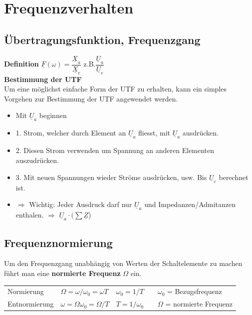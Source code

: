 \section{Frequenzverhalten}

	\subsection{Übertragungsfunktion, Frequenzgang}

		\textbf{Definition} 
		$\underline{F}(\omega) = \dfrac{\underline{X}_a}{\underline{X}_e}$ z.B.$\dfrac{\underline{U}_a}{\underline{U}_e}$\\
		
		\textbf{Bestimmung der UTF}\\
		Um eine möglichst einfache Form der UTF zu erhalten, kann ein simples Vorgehen zur Bestimmung der UTF angewendet werden.
		
		\begin{itemize}
			\item Mit $\underline{U}_a$ beginnen
			\item 1. Strom, welcher durch Element an $\underline{U}_a$ fliesst, mit $\underline{U}_a$ ausdrücken.
			\item 2. Diesen Strom verwenden um Spannung an anderen Elementen auszudrücken.
			\item 3. Mit neuen Spannungen wieder Ströme ausdrücken, usw. Bis $\underline{U}_e$ berechnet ist.
			\item $\Rightarrow$ Wichtig: Jeder Ausdruck darf nur $\underline{U}_a$ und Impedanzen/Admitanzen enthalen. $\Rightarrow$ $\underline{U}_a \cdot (\sum \underline{Z}$)
		\end{itemize} 
		
	\subsection{Frequenznormierung}
		Um den Frequenzgang unabhängig von Werten der Schaltelemente zu machen führt man eine \textbf{normierte Frequenz} $\Omega$ ein.
		
		\begin{tabular}{lllll}
			Normierung &
			$\Omega = \omega/\omega_0 = \omega T$ &
			$\omega_0 = 1/T$ & &
			$\omega_0$ = Bezugsfrequenz\\
			
			Entnormierung &
			$ \omega = \Omega\omega_0 = \Omega / T$ &
			$ T = 1 / \omega_0$ & &
			$\Omega$ = normierte Frequenz 
		\end{tabular}
		
